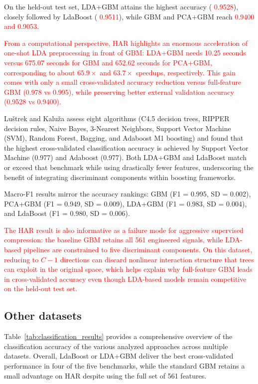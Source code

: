 \documentclass[11pt,a4paper]{article}
\providecommand{\DIFaddtex}[1]{\textcolor{red}{#1}} %
\providecommand{\DIFaddbegin}{} %
\providecommand{\DIFaddend}{} %
\providecommand{\DIFadd}[1]{\texorpdfstring{\DIFaddtex{#1}}{#1}} %
\begin{document}
On the held-out test set, LDA+GBM attains the highest accuracy ( \DIFaddbegin \DIFadd{0.9528}\DIFaddend ), closely followed by LdaBoost ( \DIFaddbegin \DIFadd{0.9511}\DIFaddend ), while GBM and PCA+GBM reach  \DIFaddbegin \DIFadd{0.9400 and 0.9053}\DIFaddend .

\DIFaddbegin \DIFadd{From a computational perspective, HAR highlights an enormous acceleration of one-shot LDA preprocessing in front of GBM: LDA+GBM needs 10.25 seconds versus 675.07 seconds for GBM and 652.62 seconds for PCA+GBM, corresponding to about $65.9\times$ and $63.7\times$ speedups, respectively. This gain comes with only a small cross-validated accuracy reduction versus full-feature GBM (0.978 vs 0.995), while preserving better external validation accuracy (0.9528 vs 0.9400).
}

\DIFaddend Luštrek and Kaluža \citep{luvstrek2009fall} assess eight algorithms (C4.5 decision trees, RIPPER decision rules, Naive Bayes, 3-Nearest Neighbors, Support Vector Machine (SVM), Random Forest, Bagging, and Adaboost M1 boosting) and found that the highest cross-validated classification accuracy is achieved by Support Vector Machine (0.977) and Adaboost (0.977). Both LDA+GBM and LdaBoost match or exceed that benchmark while using drastically fewer features, underscoring the benefit of integrating discriminant components within boosting frameworks.

Macro-F1 results mirror the accuracy rankings: GBM (F1 = 0.995, SD = 0.002), PCA+GBM (F1 = 0.949, SD = 0.009), LDA+GBM (F1 = 0.983, SD = 0.004), and LdaBoost (F1 = 0.980, SD = 0.006).

\DIFaddbegin \DIFadd{The HAR result is also informative as a failure mode for aggressive supervised compression: the baseline GBM retains all 561 engineered signals, while LDA-based pipelines are constrained to five discriminant components. On this dataset, reducing to $C-1$ directions can discard nonlinear interaction structure that trees can exploit in the original space, which helps explain why full-feature GBM leads in cross-validated accuracy even though LDA-based models remain competitive on the held-out test set.
}


\DIFaddend \subsection*{Other datasets}

Table~\ref{tab:classification_results} provides a comprehensive overview of the classification accuracy of the various analyzed approaches across multiple datasets. Overall, LdaBoost or LDA+GBM deliver the best cross-validated performance in four of the five benchmarks, while the standard GBM retains a small advantage on HAR despite using the full set of 561 features.
\end{document}
